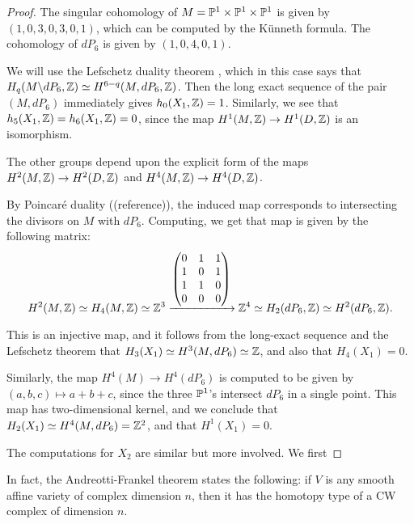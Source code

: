 \begin{proof}
The singular cohomology of $M=\mathbb{P}^1 \times \mathbb{P}^1 \times \mathbb{P}^1$ is given by $(1,0,3,0,3,0,1)$, which can be computed by the Künneth formula. The cohomology of $dP_6$ is given by $(1,0,4,0,1)$.

We will use the Lefschetz duality theorem \cite{spanier_topology}, which in this case says that $H_q(M \backslash dP_6, \mathbb{Z}) \simeq H^{6-q}(M,dP_6,\mathbb{Z})$. Then the long exact sequence of the pair $(M,dP_6)$ immediately gives $h_0(X_1,\mathbb{Z})=1$. Similarly, we see that $h_5(X_1,\mathbb{Z})=h_6(X_1,\mathbb{Z})=0$, since the map $H^1(M,\mathbb{Z}) \to H^1(D,\mathbb{Z})$ is an isomorphism.

The other groups depend upon the explicit form of the maps $H^2(M,\mathbb{Z}) \to H^2(D,\mathbb{Z})$ and $H^4(M,\mathbb{Z}) \to H^4(D,\mathbb{Z})$.

By Poincaré duality ((reference)), the induced map corresponds to intersecting the divisors on $M$ with $dP_6$. Computing, we get that map is given by the following matrix:
\[
H^2(M,\mathbb{Z}) \simeq H_4(M,\mathbb{Z}) \simeq \mathbb{Z}^3 \xrightarrow{
	\begin{pmatrix}
	0 & 1 & 1 \\
	1 & 0 & 1 \\
	1 & 1 & 0 \\
	0 & 0 & 0
	\end{pmatrix}
} \mathbb{Z}^4 \simeq H_2(dP_6,\mathbb{Z}) \simeq H^2(dP_6,\mathbb{Z}).
\]

This is an injective map, and it follows from the long-exact sequence and the Lefschetz theorem that $H_3(X_1) \simeq H^3(M,dP_6) \simeq \mathbb{Z}$, and also that $H_4(X_1)=0$.

Similarly, the map $H^4(M) \to H^4(dP_6)$ is computed to be given by $(a,b,c) \mapsto a+b+c$, since the three $\mathbb{P}^1$'s intersect $dP_6$ in a single point. This map has two-dimensional kernel, and we conclude that $H_2(X_1) \simeq H^4(M,dP_6) = \mathbb{Z}^2$, and that $H^1(X_1)=0$.

The computations for $X_2$ are similar but more involved. We first 


\end{proof}

\begin{remark}
In fact, the Andreotti-Frankel theorem \cite{andreotti_affinecw} states the following: if $V$ is any smooth affine variety of complex dimension $n$, then it has the homotopy type of a CW complex of dimension $n$.
\end{remark}